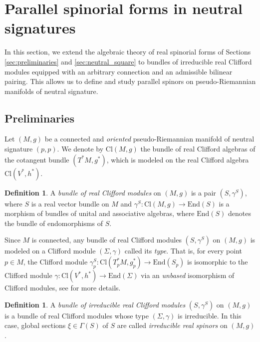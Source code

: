 \documentclass[10pt,reqno]{amsart}
\theoremstyle{definition}
\newtheorem{definition}[theorem]{Definition}
\theoremstyle{remark}
\newcommand{\End}{\mathrm{End}}
\begin{document}

\section{Parallel spinorial forms in neutral signatures}\label{sec:parallel_square}

In this section, we extend the algebraic theory of real spinorial forms of Sections \ref{sec:preliminaries} and \ref{sec:neutral_square} to bundles of irreducible real Clifford modules equipped with an arbitrary connection and an admissible bilinear pairing. This allows us to define and study parallel spinors on pseudo-Riemannian manifolds of neutral signature.

\subsection{Preliminaries}

Let $(M,g)$ be a connected and \emph{oriented} pseudo-Riemannian manifold of neutral signature $(p,p)$. We denote by $\mathrm{Cl}(M,g)$ the bundle of real Clifford algebras of the cotangent bundle $(T^*M,g^*)$, which is modeled on the real Clifford algebra $\mathrm{Cl}(V^*,h^*)$.

\begin{definition}
    A \emph{bundle of real Clifford modules} on $(M,g)$ is a pair $(S,\gamma^S)$, where $S$ is a real vector bundle on $M$ and $\gamma^S\colon\mathrm{Cl}(M,g)\to\End(S)$ is a morphism of bundles of unital and associative algebras, where $\End(S)$ denotes the bundle of endomorphisms of $S$.
\end{definition}

Since $M$ is connected, any bundle of real Clifford modules $(S,\gamma^S)$ on $(M,g)$ is modeled on a Clifford module $(\Sigma,\gamma)$ called its \emph{type}. That is, for every point $p\in M$, the Clifford module $\gamma^S_p\colon\mathrm{Cl}(T^*_pM,g^*_p)\to\End(S_p)$ is isomorphic to the Clifford module $\gamma\colon\mathrm{Cl}(V^*,h^*)\to\End(\Sigma)$ via an \emph{unbased} isomorphism of Clifford modules, see \cite{Lazaroiu_Shahbazi2019} for more details.

\begin{definition}
    A \emph{bundle of irreducible real Clifford modules} $(S,\gamma^S)$ on $(M,g)$ is a bundle of real Clifford modules whose type $(\Sigma,\gamma)$ is irreducible. In this case, global sections $\xi\in\Gamma(S)$ of $S$ are called \emph{irreducible real spinors} on $(M,g)$.
\end{definition}
\end{document}
